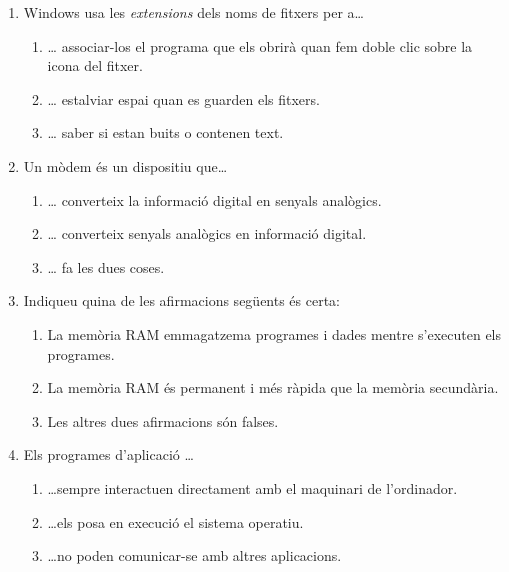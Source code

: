 \begin{enumerate}

\item Windows usa les \emph{extensions} dels noms de fitxers per
  a{\ldots}
  \begin{enumerate}
  \item {\ldots} associar-los el programa que els obrirà quan fem
    doble clic sobre la icona del fitxer.
  \item {\ldots} estalviar espai quan es guarden els fitxers.
  \item {\ldots} saber si estan buits o contenen text.
  \end{enumerate}

\item Un mòdem és un dispositiu que{\ldots}
  \begin{enumerate}
  \item {\ldots} converteix la informació digital en senyals
    analògics.
  \item {\ldots} converteix senyals analògics en informació digital.
  \item {\ldots} fa les dues coses.
  \end{enumerate}

\item Indiqueu quina de les afirmacions següents és certa:
  \begin{enumerate}
  \item La memòria RAM emmagatzema programes i dades mentre s'executen
    els programes.  
  \item La memòria RAM és permanent i més ràpida que la memòria
    secundària.
  \item Les altres dues afirmacions són falses.
  \end{enumerate}

\item Els programes d'aplicació \ldots 
  \begin{enumerate}
  \item \ldots sempre interactuen directament amb el maquinari de
    l'ordinador.  
  \item \ldots els posa en execució el sistema operatiu.
  \item \ldots no poden comunicar-se amb altres
    aplicacions.
  \end{enumerate}


\end{enumerate}
